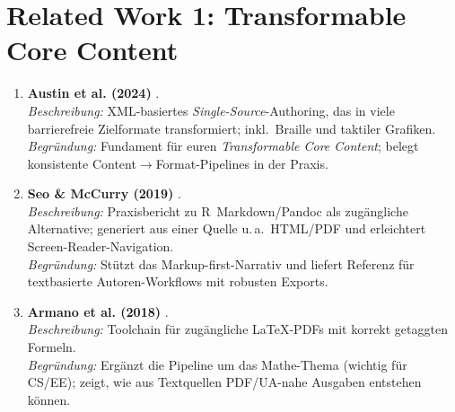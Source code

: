\section{Related Work 1: Transformable Core Content}
\begin{enumerate}
  \item \textbf{Austin et al. (2024)} \cite{Austin2024PreTeXt}.\\
  \emph{Beschreibung:} XML-basiertes \emph{Single-Source}-Authoring, das in viele barrierefreie Zielformate transformiert; inkl.\ Braille und taktiler Grafiken.\\
  \emph{Begründung:} Fundament für euren \emph{Transformable Core Content}; belegt konsistente Content$\rightarrow$Format-Pipelines in der Praxis.
  
  \item \textbf{Seo \& McCurry (2019)} \cite{Seo2019RMarkdown}.\\
  \emph{Beschreibung:} Praxisbericht zu R~Markdown/Pandoc als zugängliche Alternative; generiert aus einer Quelle u.\,a.\ HTML/PDF und erleichtert Screen-Reader-Navigation.\\
  \emph{Begründung:} Stützt das Markup-first-Narrativ und liefert Referenz für textbasierte Autoren-Workflows mit robusten Exports.
  
  \item \textbf{Armano et al. (2018)} \cite{Armano2018LaTeXPDF}.\\
  \emph{Beschreibung:} Toolchain für zugängliche LaTeX-PDFs mit korrekt getaggten Formeln.\\
  \emph{Begründung:} Ergänzt die Pipeline um das Mathe-Thema (wichtig für CS/EE); zeigt, wie aus Textquellen PDF/UA-nahe Ausgaben entstehen können.
\end{enumerate}

